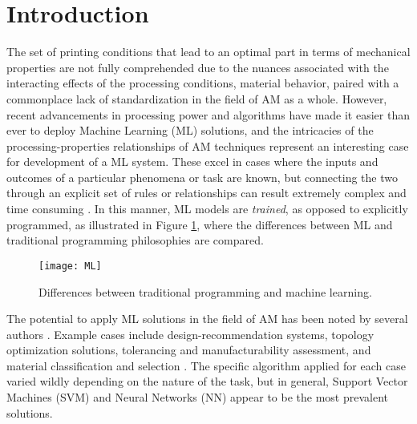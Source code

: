 \documentclass[main.tex]{subfiles}
\begin{document}
\section{Introduction} \label{sec:ml_intr}

The set of printing conditions that lead to an optimal part in terms of mechanical properties are not fully comprehended due to the nuances associated with the interacting effects of the processing conditions, material behavior, paired with a commonplace lack of standardization in the field of AM as a whole. However, recent advancements in processing power and algorithms have made it easier than ever to deploy Machine Learning (ML) solutions, and the intricacies of the processing-properties relationships of AM techniques represent an interesting case for development of a ML system. These excel in cases where the inputs and outcomes of a particular phenomena or task are known, but connecting the two through an explicit set of rules or relationships can result extremely complex and time consuming \cite{Chollet2018}. In this manner, ML models are \emph{trained}, as opposed to explicitly programmed, as illustrated in Figure \ref{fig:MLvsP_2}, where the differences between ML and traditional programming philosophies are compared. 

\begin{figure}[!htbp]
	\center
	\texttt{[image: ML]}
	\caption{Differences between traditional programming and machine learning. \cite{Chollet2018}} \label{fig:MLvsP_2}
\end{figure}

The potential to apply ML solutions in the field of AM has been noted by several authors \cite{Razvi2019,Meng2020}. Example cases include design-recommendation systems, topology optimization solutions, tolerancing and manufacturability assessment, and material classification and selection \cite{Razvi2019}. The specific algorithm applied for each case varied wildly depending on the nature of the task, but in general, Support Vector Machines (SVM) and Neural Networks (NN) appear to be the most prevalent solutions.
\end{document}
